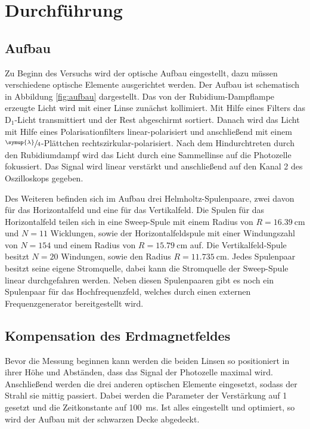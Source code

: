 \newpage
\section{Durchführung}
\label{sec:Durchführung}
\subsection{Aufbau}
\label{sec:aufbau}
Zu Beginn des Versuchs wird der optische Aufbau eingestellt, dazu müssen verschiedene optische Elemente 
ausgerichtet werden.
Der Aufbau ist schematisch in Abbildung \ref{fig:aufbau} dargestellt. Das von der Rubidium-Dampflampe
erzeugte Licht wird mit einer Linse zunächst kollimiert. Mit Hilfe eines Filters das $\text{D}_1$-Licht
transmittiert und der Rest abgeschirmt sortiert. Danach wird das Licht mit Hilfe eines Polarisationfilters
linear-polarisiert und anschließend mit einem $\sfrac{\symup{\lambda}}{4}$-Plättchen rechtszirkular-polarisiert.
Nach dem Hindurchtreten durch den Rubidiumdampf wird das Licht durch eine Sammellinse auf die Photozelle
fokussiert. Das Signal wird linear verstärkt und anschließend auf den Kanal 2 des Oszilloskops gegeben.

Des Weiteren befinden sich im Aufbau drei Helmholtz-Spulenpaare, zwei davon für das Horizontalfeld und eine für das Vertikalfeld.
Die Spulen für das Horizontalfeld teilen sich in eine Sweep-Spule mit einem Radius von $R=\SI{16.39}{\centi\meter}$ und
$N=\num{11}$ Wicklungen, sowie der Horizontalfeldspule mit einer Windungszahl von $N=\num{154}$ und einem 
Radius von $R=\SI{15.79}{\centi\meter}$ auf. Die Vertikalfeld-Spule besitzt $N=\num{20}$ Windungen, 
sowie den Radius $R=\SI{11.735}{\centi\meter}$. Jedes Spulenpaar besitzt seine eigene Stromquelle, dabei kann die Stromquelle der
Sweep-Spule linear durchgefahren werden.
Neben diesen Spulenpaaren gibt es noch ein Spulenpaar für das Hochfrequenzfeld, welches durch einen externen Frequenzgenerator
bereitgestellt wird.

\subsection{Kompensation des Erdmagnetfeldes}
\label{sec:erdmagnetfeld}
Bevor die Messung beginnen kann werden die beiden Linsen so positioniert in ihrer Höhe und Abständen, dass das Signal der Photozelle
maximal wird. Anschließend werden die drei anderen optischen Elemente eingesetzt, sodass der Strahl sie mittig passiert. Dabei werden
die Parameter der Verstärkung auf \num{1} gesetzt und die Zeitkonstante auf \SI{100}{\milli\second}. Ist alles eingestellt und optimiert,
so wird der Aufbau mit der schwarzen Decke abgedeckt.

